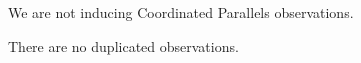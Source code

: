 \documentclass[12pt]{article}
\begin{document}
%
%
\coordinatedobs %
We are not inducing Coordinated Parallels observations.


%
%
\duplications           %
There are no duplicated observations.



\clearpage

%
%
\analysisplan %



\end{document}
